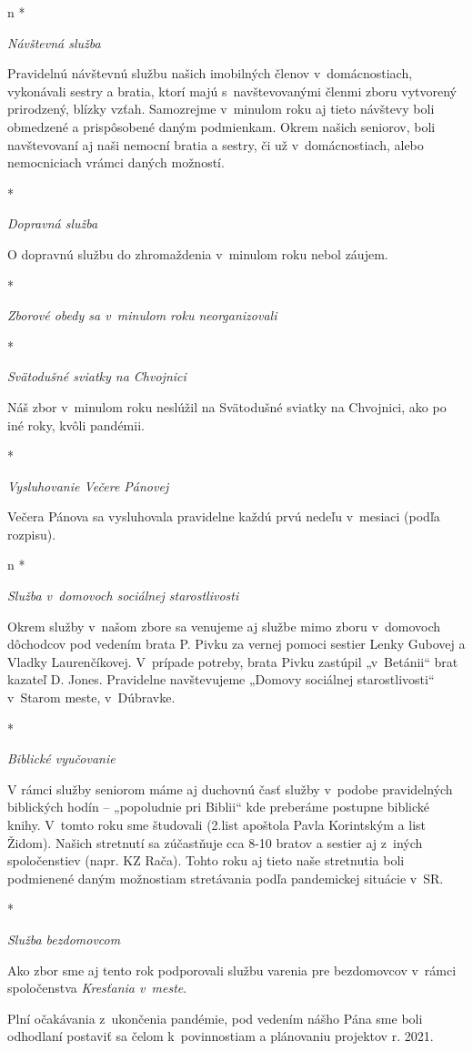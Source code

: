 \def\aktivita#1{{\it #1\par}\firstnoindent}

\begitems \style n
* \aktivita{Návštevná služba}
Pravidelnú návštevnú službu našich imobilných členov v~domácnostiach, vykonávali sestry a bratia, ktorí majú s~navštevovanými členmi zboru vytvorený prirodzený, blízky vzťah. Samozrejme v~minulom roku aj tieto návštevy boli obmedzené a prispôsobené daným podmienkam. Okrem našich seniorov, boli navštevovaní aj naši nemocní bratia a sestry, či už v~domácnostiach, alebo nemocniciach vrámci daných možností.

* \aktivita{Dopravná služba}
O dopravnú službu do zhromaždenia v~minulom roku nebol záujem.

* \aktivita{Zborové obedy sa v~minulom roku neorganizovali}

* \aktivita{Svätodušné sviatky na Chvojnici}
Náš zbor v~minulom roku neslúžil na Svätodušné sviatky na Chvojnici, ako po iné roky, kvôli pandémii.

* \aktivita{Vysluhovanie Večere Pánovej}
Večera Pánova sa vysluhovala pravidelne každú prvú nedeľu v~mesiaci (podľa rozpisu).
\enditems


\begitems \style n
* \aktivita{Služba v~domovoch sociálnej starostlivosti}
Okrem služby v~našom zbore sa venujeme aj službe mimo zboru v~domovoch dôchodcov pod vedením brata P. Pivku za vernej pomoci sestier Lenky Gubovej a Vladky Laurenčíkovej. V~prípade potreby, brata Pivku zastúpil „v~Betánii“ brat kazateľ D. Jones. Pravidelne navštevujeme „Domovy sociálnej starostlivosti“ v~Starom meste, v~Dúbravke.

* \aktivita{Biblické vyučovanie}
V rámci služby seniorom máme aj duchovnú časť služby v~podobe pravidelných biblických hodín -- „popoludnie pri Biblii“ kde preberáme postupne biblické knihy. V~tomto roku sme študovali (2.list apoštola Pavla Korintským a list Židom). Našich stretnutí sa zúčastňuje cca 8-10 bratov a sestier aj z~iných spoločenstiev (napr. KZ Rača). Tohto roku aj tieto naše stretnutia boli podmienené daným možnostiam stretávania podľa pandemickej situácie v~SR.

* \aktivita{Služba bezdomovcom}
Ako zbor sme aj tento rok podporovali službu varenia pre bezdomovcov v~rámci spoločenstva {\it Kresťania v~meste}.
\enditems



Plní očakávania z~ukončenia pandémie, pod vedením nášho Pána sme boli odhodlaní postaviť sa čelom k~povinnostiam a plánovaniu projektov r. 2021.

